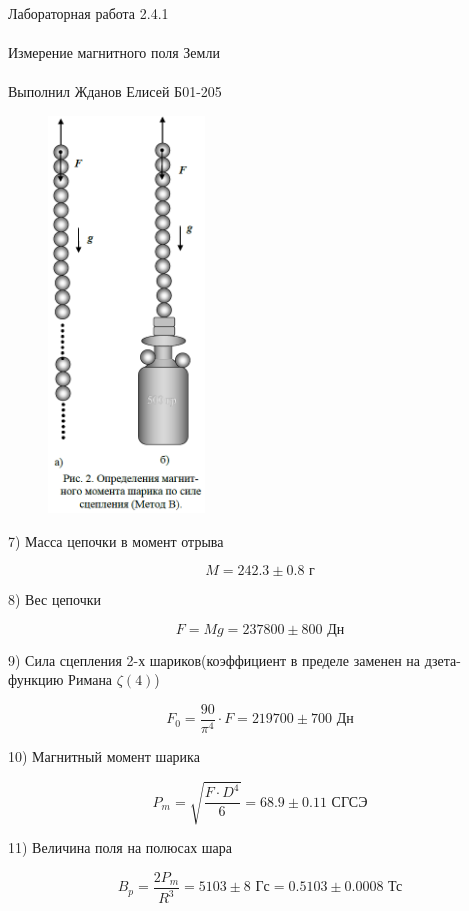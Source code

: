 \documentclass{astroedu-lab}
\begin{document}
\begin{problem}{\huge Лабораторная работа 2.4.1\\\\Измерение магнитного поля Земли\\\\Выполнил Жданов Елисей Б01-205}
\begin{figure}[!h]
	\centering
	\includegraphics[width=0.37\textwidth]{2.png}
	\label{fig:boiler}
\end{figure}

7) Масса цепочки в момент отрыва

\begin{equation}
	M = 242.3 \pm 0.8 \text{ г}
\end{equation}

8) Вес цепочки

\begin{equation}
	F = M g = 237800 \pm 800 \text{ Дн}
\end{equation}

9) Сила сцепления 2-х шариков(коэффициент в пределе заменен на дзета-функцию Римана $\zeta(4)$)

\begin{equation}
	F_0 = \frac{90}{\pi^4} \cdot F = 219700 \pm 700 \text{ Дн}
\end{equation}

10) Магнитный момент шарика

\begin{equation}
	P_m = \sqrt{\frac{F \cdot D^4}{6}} = 68.9 \pm 0.11 \text{ СГСЭ}
\end{equation}

11) Величина поля на полюсах шара

\begin{equation}
	B_p = \frac{2 P_m}{R^3} = 5103 \pm 8 \text{ Гс} = 0.5103 \pm 0.0008 \text{ Тс}
\end{equation}


\end{problem}
\end{document}
